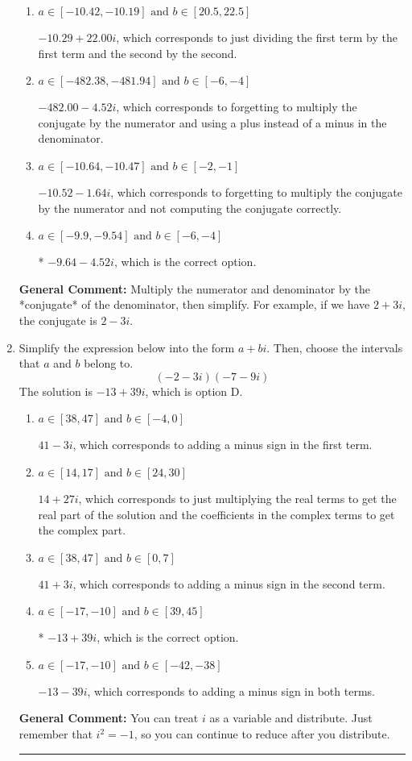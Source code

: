 \documentclass{extbook}[14pt]
\newcommand{\litem}[1]{\item #1

\rule{\textwidth}{0.4pt}}
\begin{document}
\begin{enumerate}
{\begin{enumerate}[label=\Alph*.]
 $-9.64  - 226.00 i$, which corresponds to forgetting to multiply the conjugate by the numerator.
\item \( a \in [-10.42, -10.19] \text{ and } b \in [20.5, 22.5] \)

 $-10.29  + 22.00 i$, which corresponds to just dividing the first term by the first term and the second by the second.
\item \( a \in [-482.38, -481.94] \text{ and } b \in [-6, -4] \)

 $-482.00  - 4.52 i$, which corresponds to forgetting to multiply the conjugate by the numerator and using a plus instead of a minus in the denominator.
\item \( a \in [-10.64, -10.47] \text{ and } b \in [-2, -1] \)

 $-10.52  - 1.64 i$, which corresponds to forgetting to multiply the conjugate by the numerator and not computing the conjugate correctly.
\item \( a \in [-9.9, -9.54] \text{ and } b \in [-6, -4] \)

* $-9.64  - 4.52 i$, which is the correct option.
\end{enumerate}

\textbf{General Comment:} Multiply the numerator and denominator by the *conjugate* of the denominator, then simplify. For example, if we have $2+3i$, the conjugate is $2-3i$.
}
\litem{
Simplify the expression below into the form $a+bi$. Then, choose the intervals that $a$ and $b$ belong to.
\[ (-2 - 3 i)(-7 - 9 i) \]The solution is \( -13 + 39 i \), which is option D.\begin{enumerate}[label=\Alph*.]
\item \( a \in [38, 47] \text{ and } b \in [-4, 0] \)

 $41 - 3 i$, which corresponds to adding a minus sign in the first term.
\item \( a \in [14, 17] \text{ and } b \in [24, 30] \)

 $14 + 27 i$, which corresponds to just multiplying the real terms to get the real part of the solution and the coefficients in the complex terms to get the complex part.
\item \( a \in [38, 47] \text{ and } b \in [0, 7] \)

 $41 + 3 i$, which corresponds to adding a minus sign in the second term.
\item \( a \in [-17, -10] \text{ and } b \in [39, 45] \)

* $-13 + 39 i$, which is the correct option.
\item \( a \in [-17, -10] \text{ and } b \in [-42, -38] \)

 $-13 - 39 i$, which corresponds to adding a minus sign in both terms.
\end{enumerate}

\textbf{General Comment:} You can treat $i$ as a variable and distribute. Just remember that $i^2=-1$, so you can continue to reduce after you distribute.
}
\end{enumerate}
\end{document}
